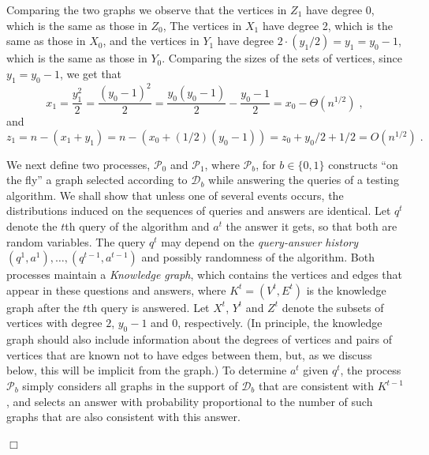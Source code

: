 \documentclass{article}
\newcommand{\bitset}{\{0,1\}}
\newcommand{\calD}{{\mathcal{D}}}
\newcommand{\calP}{{\mathcal{P}}}
\newenvironment{proof}{\smallskip\noindent{\bf Proof:}}%
        {\hspace*{\fill}$\Box$\par}
\newcommand{\ICALPCR}[1]{{#1}}
\newcommand{\ForFuture}[1]{}
\begin{document}
\begin{proof}
Comparing the two graphs we observe that the vertices in
$Z_1$ have degree 0, which is the same as those in $Z_0$, The vertices in $X_1$ have degree 2, which is the same as those in $X_0$, and  the vertices in $Y_1$ have degree 
\ICALPCR{$2\cdot (y_1/2) = y_1 = y_0-1$,}
which is the same as those in $Y_0$.
Comparing the sizes of the sets of vertices, since 
\ICALPCR{
$y_1 = y_0 - 1$,
}
we get that
$$x_1 = \frac{y_1^2}{2} = \frac{(y_0-1)^2}{2} = \frac{y_0(y_0-1)}{2} - \frac{y_0-1}{2} = x_0 - \Theta(n^{1/2})\;,$$
and
\ICALPCR{
$$z_1 = n-(x_1+y_1) = n - (x_0 + (1/2)(y_0-1)) = z_0 + y_0/2 + 1/2 = O(n^{1/2})\;.$$
}
\ForFuture{D: maybe explain a bit more}

We next define two processes, $\calP_0$ and $\calP_1$, where $\calP_b$, for $b\in \bitset$ constructs ``on the fly'' a graph selected  according to $\calD_b$ while answering the queries of a testing algorithm. We shall show that unless one of several events occurs, the distributions induced on the sequences of queries and answers are identical. Let $q^t$ denote the $t$th query of the algorithm and $a^t$ the answer it gets, so that both are random variables. The query $q^t$ may depend on the \emph{query-answer history} $(q^1,a^1),\dots,(q^{t-1},a^{t-1})$ and possibly randomness of the algorithm. Both processes maintain a \emph{Knowledge graph}, which contains the vertices and edges that appear in these questions and answers, where $K^t=(V^t,E^t)$ is the knowledge graph after the $t$th query is answered. Let $X^t$, $Y^t$ and $Z^t$ denote the subsets of vertices with degree $2$, $y_0-1$ and $0$, respectively.
(In principle, the knowledge graph should also include information about the degrees of vertices and pairs of vertices that are known not to have edges between them, but, as we discuss below, this will be implicit from the graph.)
To determine $a^t$ given $q^t$,
the process $\calP_b$ simply considers all graphs in the support of $\calD_b$ that are consistent with $K^{t-1}$, and selects an answer with probability proportional to the number of such graphs that are also consistent with this answer.


\end{proof}
\end{document}
